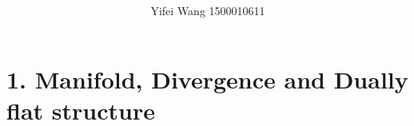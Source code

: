 \documentclass[11pt]{article}
\author{Yifei Wang 1500010611}
\title{\textbf{\titlemark}}
\date{}
\begin{document}
\maketitle

\section{1. Manifold, Divergence and Dually flat structure}

\printbibliography
\end{document}
